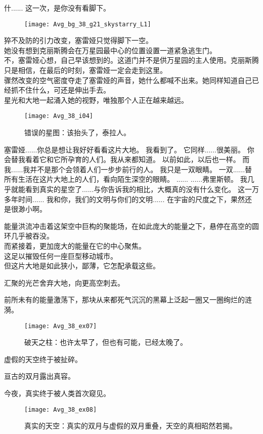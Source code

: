 \documentclass[openany]{book}
\begin{document}
\begin{dialogue}
     什......
     这一次，是你没有看脚下。\par
    \begin{figure}[h]
        \centering
        \texttt{[image: Avg\_bg\_38\_g21\_skystarry\_L1]}
    \end{figure}
    猝不及防的引力改变，塞雷娅只觉得脚下一空。\\
    她没有想到克丽斯腾会在万星园最中心的位置设置一道紧急逃生门。\\
    不，塞雷娅心想，自己早该想到的。这道门并不是供万星园的主人使用。克丽斯腾只是相信，在最后的时刻，塞雷娅一定会走到这里。\\
    骤然改变的空气密度夺走了塞雷娅的声音，她什么都喊不出来。她同样知道自己已经抓不住什么，可还是伸出手去。\\
    星光和大地一起涌入她的视野，唯独那个人正在越来越远。
    \begin{figure}[h]
        \caption*{错误的星图：该抬头了，泰拉人。}
        \centering
        \texttt{[image: Avg\_38\_i04]}
    \end{figure}
     塞雷娅......你总是想让我好好看看这片大地。
     我看到了。
     它同样......很美丽。
     你会替我看着它和它所孕育的人们。我从来都知道。
     以前如此，以后也一样。
     而我......我并不是那个会领着人们一步步前行的人。
     我只是一双眼睛。
     一双......替所有生活在这片大地上的人们，看向陌生深空的眼睛。
     ......
     ......弗里斯顿。
     我几乎就能看到真实的星空了......与你告诉我的相比，大概真的没有什么变化。
     这一万多年时间......
     我和你，我们的文明与你们的文明......
     在宇宙的尺度之下，果然还是很渺小啊。\par
    能量洪流冲击着这架空中巨构的聚能场，在如此庞大的能量之下，悬停在高空的圆环几乎被吞没。\\
    而紧接着，更加庞大的能量在它的中心聚焦。\\
    这足以摧毁任何一座巨型移动城市。\\
    但这片大地是如此狭小，鄙薄，它怎配承载这些。\par
    汇聚的光芒舍弃大地，向更高空刺去。\par
    前所未有的能量激荡下，那块从来都死气沉沉的黑幕上泛起一圈又一圈绚烂的涟漪。\par
    \begin{figure}[h]
        \caption*{破天之柱：也许太早了，但也有可能，已经太晚了。}
        \centering
        \texttt{[image: Avg\_38\_ex07]}
    \end{figure}
    虚假的天空终于被扯碎。\par
    亘古的双月露出真容。\par
    今夜，真实终于被人类首次窥见。
\end{dialogue}
\begin{figure}[h]
    \caption*{真实的天空：真实的双月与虚假的双月重叠，天空的真相昭然若揭。}
    \centering
    \texttt{[image: Avg\_38\_ex08]}
\end{figure}
\end{document}
